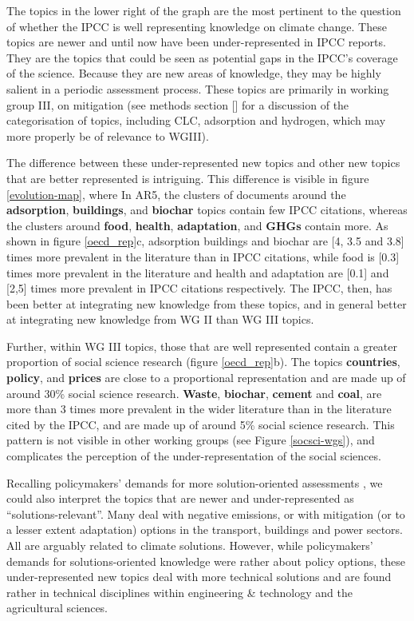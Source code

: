 \documentclass{article}
\begin{document}
\begin{linenumbers}
		The topics in the lower right of the graph are the most pertinent to the question of whether the IPCC is well representing knowledge on climate change. These topics are newer and until now have been under-represented in IPCC reports. They are the topics that could be seen as potential gaps in the IPCC's coverage of the science. Because they are new areas of knowledge, they may be highly salient in a periodic assessment process. These topics are primarily in working group III, on mitigation (see methods section [] for a discussion of the categorisation of topics, including CLC, adsorption and hydrogen, which may more properly be of relevance to WGIII).
		
		
		The difference between these under-represented new topics and other new topics that are better represented is intriguing. This difference is visible in figure \ref{evolution-map}, where In AR5, the clusters of documents around the \textbf{adsorption}, \textbf{buildings}, and \textbf{biochar} topics contain few IPCC citations, whereas the clusters around \textbf{food}, \textbf{health}, \textbf{adaptation}, and \textbf{GHGs} contain more. As shown in figure \ref{oecd_rep}c, adsorption buildings and biochar are [4, 3.5 and 3.8] times more prevalent in the literature than in IPCC citations, while food is [0.3] times more prevalent in the literature and health and adaptation are [0.1] and [2,5] times more prevalent in IPCC citations respectively. The IPCC, then, has been better at integrating new knowledge from these topics, and in general better at integrating new knowledge from WG II  than WG III topics.
		
		Further, within WG III topics, those that are well represented contain a greater proportion of social science research (figure \ref{oecd_rep}b). The topics \textbf{countries}, \textbf{policy}, and \textbf{prices} are close to a proportional representation and are made up of around 30\% social science research. \textbf{Waste}, \textbf{biochar}, \textbf{cement} and \textbf{coal}, are more than 3 times more prevalent in the wider literature than in the literature cited by the IPCC, and are made up of around 5\% social science research. This pattern is not visible in other working groups (see Figure \ref{socsci-wgs}), and complicates the perception of the under-representation of the social sciences.
		
		
		Recalling policymakers' demands for more solution-oriented assessments \cite{Kowarsch2017}, we could also interpret the topics that are newer and under-represented as ``solutions-relevant''. Many deal with negative emissions, or with mitigation (or to a lesser extent adaptation) options in the transport, buildings and power sectors. All are arguably related to climate solutions. However, while policymakers' demands for solutions-oriented knowledge were rather about policy options, these under-represented new topics deal with more technical solutions and are found rather in technical disciplines within engineering \& technology and the agricultural sciences.
		

\end{linenumbers}
\end{document}
